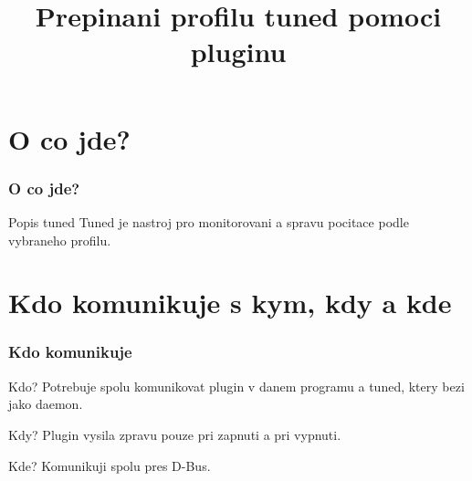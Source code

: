 \documentclass[pdf]{beamer}
\begin{document}
\title[Prepinani profilu tuned pomoci pluginu]{Prepinani profilu tuned pomoci pluginu}
\subtitle {}

\subject{Plugin pro automaticke nastaveni profilu tuned}


\frame{
 \titlepage
}

\section{O co jde?}
\begin{frame} %
	\frametitle{O co jde?}
	\begin{block}{Popis tuned}
		Tuned je nastroj pro monitorovani a spravu pocitace podle vybraneho profilu.	
	\end{block}
\end{frame} %

\section{Kdo komunikuje s kym, kdy a kde}
\begin{frame} %
	\frametitle{Kdo komunikuje}
	\begin{block}{Kdo?}
		Potrebuje spolu komunikovat plugin v danem programu a tuned, ktery bezi jako daemon.
	\end{block}
	\begin{block}{Kdy?}
		Plugin vysila zpravu pouze pri zapnuti a pri vypnuti.
	\end{block}
	\begin{block}{Kde?}
		Komunikuji spolu pres D-Bus.
	\end{block}
\end{frame} %
\end{document}
